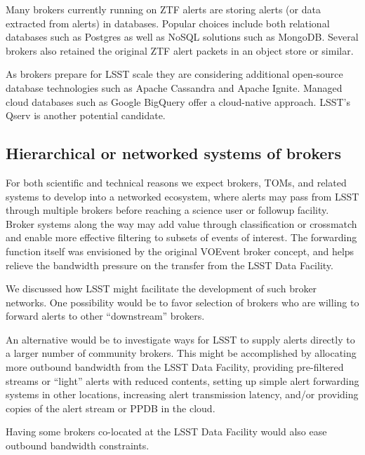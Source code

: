 Many brokers currently running on ZTF alerts are storing alerts (or data extracted from alerts) in databases.
Popular choices include both relational databases such as Postgres as well as NoSQL solutions such as MongoDB.
Several brokers also retained the original ZTF alert packets in an object store or similar.

As brokers prepare for LSST scale they are considering additional open-source database technologies such as Apache Cassandra and Apache Ignite.
Managed cloud databases such as Google BigQuery offer a cloud-native approach. 
LSST's Qserv \citep{2011Wang:2011:QDS:2063348.2063364} is another potential candidate.

\subsection{Hierarchical or networked systems of brokers}

For both scientific and technical reasons we expect brokers, TOMs, and related systems to develop into a networked ecosystem, where alerts may pass from LSST through multiple brokers before reaching a science user or followup facility.
Broker systems along the way may add value through classification or crossmatch and enable more effective filtering to subsets of events of interest.
The forwarding function itself was envisioned by the original VOEvent broker concept, and helps relieve the bandwidth pressure on the transfer from the LSST Data Facility.

We discussed how LSST might facilitate the development of such broker networks.
One possibility would be to favor selection of brokers who are willing to forward alerts to other ``downstream'' brokers.

An alternative would be to investigate ways for LSST to supply alerts directly to a larger number of community brokers.
This might be accomplished by allocating more outbound bandwidth from the LSST Data Facility, providing pre-filtered streams or ``light'' alerts with reduced contents, setting up simple alert forwarding systems in other locations, increasing alert transmission latency, and/or providing copies of the alert stream or PPDB in the cloud.

Having some brokers co-located at  the LSST Data Facility would also ease outbound bandwidth constraints.


